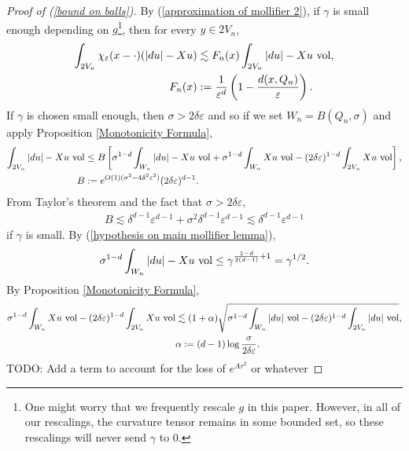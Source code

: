 \begin{proof}[Proof of (\ref{bound on balls})]
By (\ref{approximation of mollifier 2}), if $\gamma$ is small enough depending on $g$\footnote{One might worry that we frequently rescale $g$ in this paper.
However, in all of our rescalings, the curvature tensor remains in some bounded set, so these rescalings will never send $\gamma$ to $0$.}, then for every $y \in 2V_n$,
\begin{align*}
\int_{2V_n} \chi_\varepsilon(x - \cdot)(|du| - Xu) &\lesssim F_n(x) \int_{2V_n} |du| - Xu ~\mathrm{vol}, \\
F_n(x) &:= \frac{1}{\varepsilon^d}\left(1 - \frac{d(x, Q_n)}{\varepsilon}\right).
\end{align*}
If $\gamma$ is chosen small enough, then $\sigma > 2\delta\varepsilon$ and so if we set $W_n = B(Q_n, \sigma)$ and apply Proposition \ref{Monotonicity Formula},
\begin{align*}
\int_{2V_n}|du| - Xu ~\mathrm{vol} &\leq
B \left[\sigma^{1 - d}\int_{W_n} |du| - Xu ~\mathrm{vol} + \sigma^{1 - d}\int_{W_n} Xu ~\mathrm{vol} - (2\delta\varepsilon)^{1 - d}\int_{2V_n} Xu ~\mathrm{vol} \right],\\
B &:= e^{O(1)(\sigma^2 - 4\delta^2\varepsilon^2)}(2\delta\varepsilon)^{d - 1}.
\end{align*}
From Taylor's theorem and the fact that $\sigma > 2\delta\varepsilon$,
\begin{align*}
B \lesssim \delta^{d - 1} \varepsilon^{d - 1} + \sigma^2 \delta^{d - 1} \varepsilon^{d - 1} \lesssim \delta^{d - 1} \varepsilon^{d - 1}
\end{align*}
if $\gamma$ is small.
By (\ref{hypothesis on main mollifier lemma}),
$$\sigma^{1 - d}\int_{W_n} |du| - Xu ~\mathrm{vol} \leq \gamma^{\frac{1 - d}{2(d - 1)} + 1} = \gamma^{1/2}.$$
By Proposition \ref{Monotonicity Formula},
\begin{align*}
\sigma^{1 - d}\int_{W_n} Xu ~\mathrm{vol} - (2\delta\varepsilon)^{1 - d}\int_{2V_n} Xu ~\mathrm{vol} &\lesssim (1 + \alpha)\sqrt{\sigma^{1 - d} \int_{W_n} |du| ~\mathrm{vol} - (2\delta\varepsilon)^{1 - d} \int_{2V_n} |du| ~\mathrm{vol}},\\
&\alpha := (d - 1)\log \frac{\sigma}{2\delta\varepsilon}.
\end{align*}
TODO: Add a term to account for the loss of $e^{Ar^2}$ or whatever


\end{proof}
